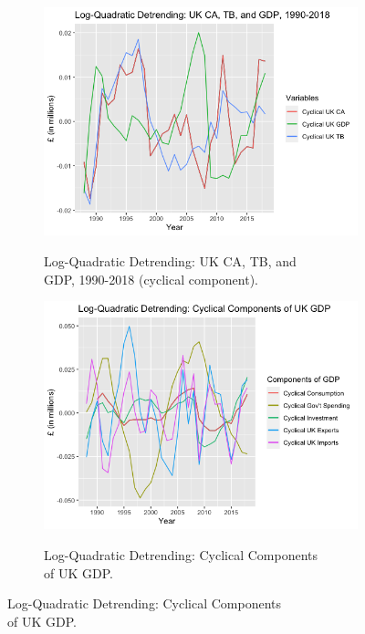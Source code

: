 \documentclass[12pt]{article}
\begin{document}
\begin{figure}[h!]
\centering
\begin{subfigure}{.5\textwidth}
  \centering
\includegraphics[scale=0.45]{8.png}
\label{}
\caption{Log-Quadratic Detrending: UK CA, TB, and \\ GDP, 1990-2018 (cyclical component).}
\end{subfigure}%
\begin{subfigure}{.5\textwidth}
\includegraphics[scale=0.45]{9.png}
\label{}
\caption{Log-Quadratic Detrending: Cyclical Components \\ of UK GDP.}
\end{subfigure}
\end{figure}
\end{document}
